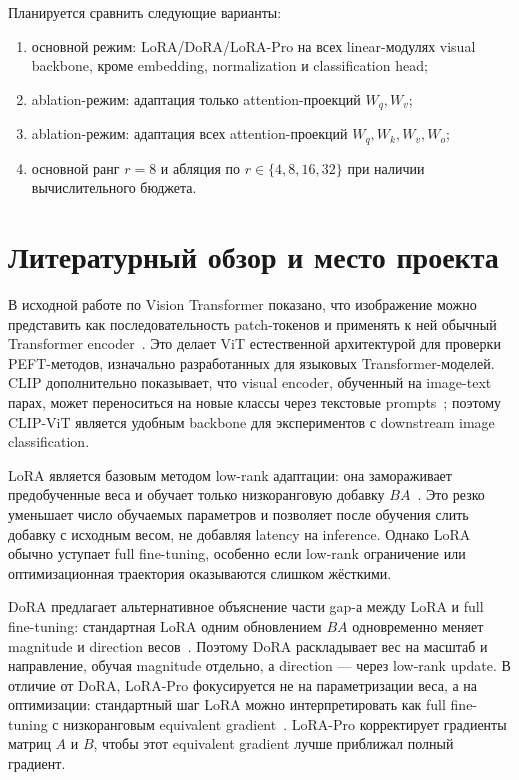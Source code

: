 \documentclass[]{scrartcl}
\begin{document}
Планируется сравнить следующие варианты:
\begin{enumerate}
    \item основной режим: LoRA/DoRA/LoRA-Pro на всех linear-модулях visual backbone, кроме embedding, normalization и classification head;
    \item ablation-режим: адаптация только attention-проекций $W_q,W_v$;
    \item ablation-режим: адаптация всех attention-проекций $W_q,W_k,W_v,W_o$;
    \item основной ранг $r=8$ и абляция по $r \in \{4,8,16,32\}$ при наличии вычислительного бюджета.
\end{enumerate}
\section{Литературный обзор и место проекта}

В исходной работе по Vision Transformer показано, что изображение можно представить как последовательность patch-токенов и применять к ней обычный Transformer encoder~\cite{dosovitskiy2021vit}. Это делает ViT естественной архитектурой для проверки PEFT-методов, изначально разработанных для языковых Transformer-моделей. CLIP дополнительно показывает, что visual encoder, обученный на image-text парах, может переноситься на новые классы через текстовые prompts~\cite{radford2021clip}; поэтому CLIP-ViT является удобным backbone для экспериментов с downstream image classification.

LoRA является базовым методом low-rank адаптации: она замораживает предобученные веса и обучает только низкоранговую добавку $BA$~\cite{hu2022lora}. Это резко уменьшает число обучаемых параметров и позволяет после обучения слить добавку с исходным весом, не добавляя latency на inference. Однако LoRA обычно уступает full fine-tuning, особенно если low-rank ограничение или оптимизационная траектория оказываются слишком жёсткими.

DoRA предлагает альтернативное объяснение части gap-а между LoRA и full fine-tuning: стандартная LoRA одним обновлением $BA$ одновременно меняет magnitude и direction весов~\cite{liu2024dora}. Поэтому DoRA раскладывает вес на масштаб и направление, обучая magnitude отдельно, а direction --- через low-rank update. В отличие от DoRA, LoRA-Pro фокусируется не на параметризации веса, а на оптимизации: стандартный шаг LoRA можно интерпретировать как full fine-tuning с низкоранговым equivalent gradient~\cite{wang2025lorapro}. LoRA-Pro корректирует градиенты матриц $A$ и $B$, чтобы этот equivalent gradient лучше приближал полный градиент.
\end{document}
